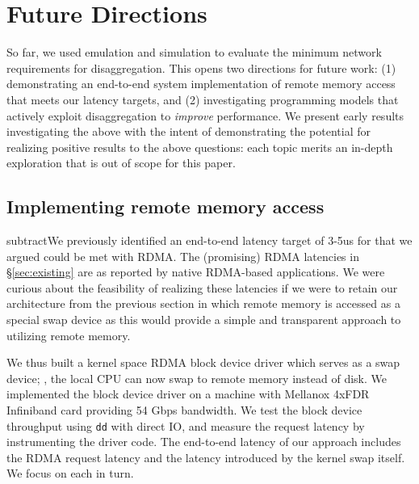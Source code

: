 \vspace{-0.1in}
\section{Future Directions}
\label{sec:future}
\vspace{-0.05in}

So far, we used emulation and simulation to evaluate the minimum network requirements for  disaggregation.%
This opens two directions for future work: (1) demonstrating an end-to-end system implementation of remote memory access that meets our latency targets, and (2) investigating programming models that actively exploit disaggregation to \emph{improve} performance.
We present early results investigating the above with the intent of demonstrating the potential for realizing positive results to the above questions: each topic merits an in-depth exploration that is out of scope for this paper.


\vspace{-0.1in}
\subsection{Implementing remote memory access}
\vspace{-0.05in}
subtractWe previously identified an end-to-end latency target of 3-5us for \dis that we argued could be met with RDMA. The (promising) RDMA latencies in \S\ref{sec:existing} are as reported by native RDMA-based applications. 
We were curious about the feasibility of realizing these latencies if we were to retain our architecture from the previous section in which remote memory is accessed as a special swap device as this would provide a simple and transparent approach to utilizing remote memory. 

We thus built a kernel space RDMA block device driver which serves as a swap device; \ie, the local CPU can now swap to remote memory instead of disk.
We implemented the block device driver on a machine with Mellanox 4xFDR Infiniband card providing 54 Gbps bandwidth.
We test the block device throughput using \texttt{dd} with direct IO, and measure the request latency by instrumenting the driver code. 
The end-to-end latency of our approach includes the RDMA request latency and the latency introduced by the kernel swap itself. We focus on each in turn. 

